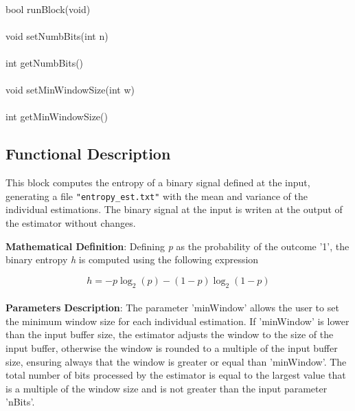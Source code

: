 \paragraph{}
bool runBlock(void)
\paragraph{}
void setNumbBits(int n)
\paragraph{}
int getNumbBits()
\paragraph{}
void setMinWindowSize(int w)
\paragraph{}
int getMinWindowSize()


\subsection*{Functional Description}
This block computes the entropy of a binary signal defined at the input, generating 
a file \texttt{"entropy\_est.txt"} with the mean and variance of the individual estimations.
The binary signal at the input is writen at the output of the estimator without changes.

\textbf{Mathematical Definition}: Defining \textit{p} as the probability of the 
outcome '1', the binary entropy \textit{h} is computed using the following expression

\begin{equation}
h = -p\log_2(p) - (1-p)\log_2(1-p)
\end{equation}  
   
\paragraph{}
\textbf{Parameters Description}: The parameter 'minWindow' allows the user to set the 
minimum window size for each individual estimation. If 'minWindow' is lower than the 
input buffer size, the estimator adjusts the window to the size of the input buffer, 
otherwise the window is rounded to a multiple of the input buffer size, ensuring always 
that the window is greater or equal than 'minWindow'. The total number of bits processed 
by the estimator is equal to the largest value that is a multiple of the window size and 
is not greater than the input parameter 'nBits'.




